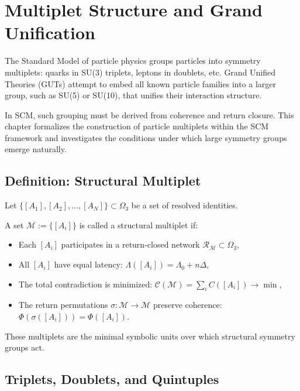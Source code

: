 \chapter{Multiplet Structure and Grand Unification} \label{chapter-multiplet-symmetry}

The Standard Model of particle physics groups particles into symmetry multiplets: quarks in SU(3) triplets, leptons in doublets, etc. Grand Unified Theories (GUTs) attempt to embed all known particle families into a larger group, such as SU(5) or SU(10), that unifies their interaction structure.

In SCM, such grouping must be derived from coherence and return closure. This chapter formalizes the construction of particle multiplets within the SCM framework and investigates the conditions under which large symmetry groups emerge naturally.

\section{Definition: Structural Multiplet}

Let \( \{[A_1], [A_2], \dots, [A_N]\} \subset \Omega_3 \) be a set of resolved identities.

\begin{definition}
A set \( \mathcal{M} := \{[A_i]\} \) is called a structural multiplet if:

\begin{itemize}
  \item Each \( [A_i] \) participates in a return-closed network \( \mathcal{R}_\mathcal{M} \subset \Omega_3 \),
  \item All \( [A_i] \) have equal latency: \( \Lambda([A_i]) = \Lambda_0 + n\Delta \),
  \item The total contradiction is minimized: \( \mathcal{C}(\mathcal{M}) = \sum_i C([A_i]) \to \min \),
  \item The return permutations \( \sigma: \mathcal{M} \to \mathcal{M} \) preserve coherence: \( \Phi(\sigma([A_i])) = \Phi([A_i]) \).
\end{itemize}

\end{definition}

\noindent These multiplets are the minimal symbolic units over which structural symmetry groups act.

\section{Triplets, Doublets, and Quintuples}

